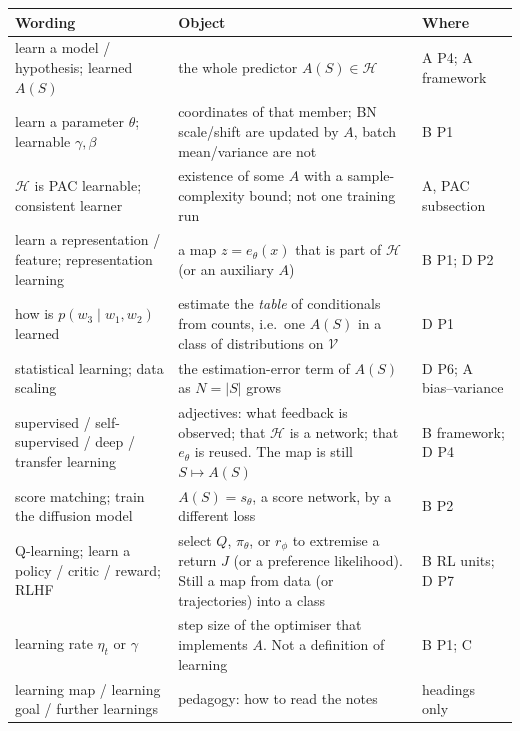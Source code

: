 \documentclass[11pt,a4paper]{article}
\theoremstyle{definition}
\begin{document}
{\footnotesize
\setlength{\tabcolsep}{3pt}
\renewcommand{\arraystretch}{1.15}
\noindent
\begin{tabularx}{\linewidth}{|
  >{\raggedright\arraybackslash}p{3.35cm}|
  >{\raggedright\arraybackslash}X|
  >{\raggedright\arraybackslash}p{3.15cm}|
}
\hline
\textbf{Wording} & \textbf{Object} & \textbf{Where} \\
\hline
learn a model / hypothesis; learned \(A(S)\) & the whole predictor \(A(S)\in\mathcal{H}\) & A P4; A framework \\
\hline
learn a parameter \(\theta\); learnable \(\gamma,\beta\) & coordinates of that member; BN scale/shift are updated by \(A\), batch mean/variance are not & B P1 \\
\hline
\(\mathcal{H}\) is PAC learnable; consistent learner & existence of some \(A\) with a sample-complexity bound; not one training run & A, PAC subsection \\
\hline
learn a representation / feature; representation learning & a map \(z=e_\theta(x)\) that is part of \(\mathcal{H}\) (or an auxiliary \(A\)) & B P1; D P2 \\
\hline
how is \(p(w_3\mid w_1,w_2)\) learned & estimate the \emph{table} of conditionals from counts, i.e.\ one \(A(S)\) in a class of distributions on \(\mathcal{V}\) & D P1 \\
\hline
statistical learning; data scaling & the estimation-error term of \(A(S)\) as \(N=|S|\) grows & D P6; A bias--variance \\
\hline
supervised / self-supervised / deep / transfer learning & adjectives: what feedback is observed; that \(\mathcal{H}\) is a network; that \(e_\theta\) is reused. The map is still \(S\mapsto A(S)\) & B framework; D P4 \\
\hline
score matching; train the diffusion model & \(A(S)=s_\theta\), a score network, by a different loss & B P2 \\
\hline
Q-learning; learn a policy / critic / reward; RLHF & select \(Q\), \(\pi_\theta\), or \(r_\phi\) to extremise a return \(J\) (or a preference likelihood). Still a map from data (or trajectories) into a class & B RL units; D P7 \\
\hline
learning rate \(\eta_t\) or \(\gamma\) & step size of the optimiser that implements \(A\). Not a definition of learning & B P1; C \\
\hline
learning map / learning goal / further learnings & pedagogy: how to read the notes & headings only \\
\hline
\end{tabularx}
}
\end{document}
